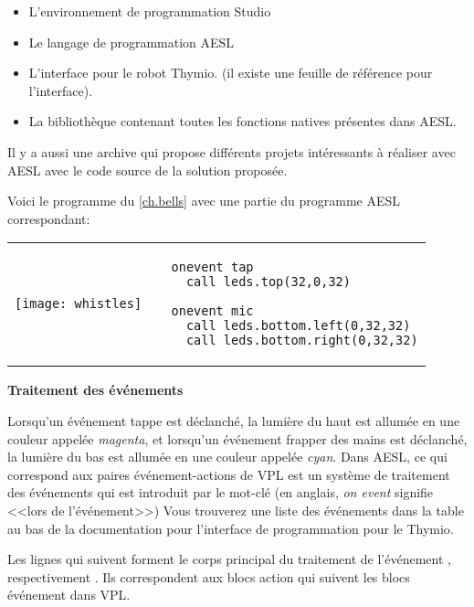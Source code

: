 \begin{itemize}
\item L'environnement de programmation Studio
\item Le langage de programmation AESL
\item L'interface pour le robot Thymio.
(il existe une feuille de référence pour l'interface).
\item La bibliothèque contenant toutes les fonctions natives présentes dans AESL.
\end{itemize}

Il y a aussi une archive qui propose différents projets intéressants à réaliser avec AESL
avec le code source de la solution proposée.


Voici le programme  du \cref{ch.bells} avec une partie du programme AESL correspondant:

\begin{center}
\begin{tabular}{ll}
\texttt{[image: whistles]} &
\begin{minipage}[b]{.5\textwidth}
\begin{footnotesize}
\begin{verbatim}
  onevent tap
    call leds.top(32,0,32)
  
  onevent mic
    call leds.bottom.left(0,32,32)
    call leds.bottom.right(0,32,32)
\end{verbatim}
\end{footnotesize}
\vspace*{8ex}
\end{minipage}
\end{tabular}
\end{center}

\textbf{\large Traitement des événements}

Lorsqu'un événement tappe est déclanché, la lumière du haut est allumée en une couleur appelée
\emph{magenta},
et lorsqu'un événement frapper des mains est déclanché, la lumière du bas est allumée en une couleur 
appelée \emph{cyan}.
Dans AESL, ce qui correspond aux paires événement-actions de VPL est un système de traitement des événements
qui est introduit par le mot-clé  (en anglais, \emph{on event} signifie <<lors de l'événement>>)
Vous trouverez une liste des événements dans la table au bas de la documentation pour l'interface
de programmation pour le Thymio.

Les lignes qui suivent  forment le corps principal du traitement de l'événement , respectivement .
Ils correspondent aux blocs action qui suivent les blocs événement dans VPL.

